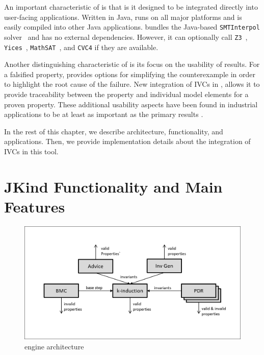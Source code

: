 An important characteristic of \jkind is that is it designed to be integrated directly into user-facing applications. Written in Java, \jkind runs on all major platforms and is easily compiled into other Java applications. \jkind bundles the Java-based \texttt{SMTInterpol} solver~\cite{Christ2012:SMTInterpol} and has no external dependencies. However, it can optionally call
\texttt{Z3}~\cite{DeMoura08:z3},
\texttt{Yices}~\cite{Dutertre06:yices}, \texttt{MathSAT}~\cite{Cimatti2013:MathSAT}, and \texttt{CVC4} \cite{barrett2011cvc4} if they are available.

Another distinguishing characteristic of \jkind is its focus on the usability  of results. For a falsified property, \jkind provides options for simplifying the
counterexample in order to highlight the root cause of the failure. New integration of IVCs in \jkind , allows it to provide traceability between the property and individual model elements for a proven property. These additional usability aspects have been found in industrial applications to be at least as important as the primary results \cite{jkindpaper}.

In the rest of this chapter, we describe \jkind architecture, functionality, and applications. Then, we provide implementation details about the integration of IVCs in this tool.


\section{{\sc JKind} Functionality and Main Features}

\begin{figure}
  \centering
  \includegraphics[width=\textwidth]{engines.png}

  \caption{\jkind engine architecture}
  \label{fig:engines}
\end{figure}

